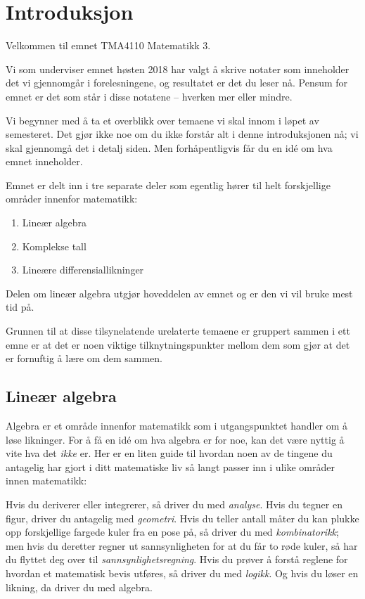 

\chapter*{Introduksjon}
\label{ch:introduksjon}

Velkommen til emnet TMA4110 Matematikk 3.

Vi som underviser emnet høsten 2018 har valgt å skrive notater som
inneholder det vi gjennomgår i forelesningene, og resultatet er det du
leser nå.  Pensum for emnet er det som står i disse notatene --
hverken mer eller mindre.

Vi begynner med å ta et overblikk over temaene vi skal innom i løpet
av semesteret.  Det gjør ikke noe om du ikke forstår alt i denne
introduksjonen nå; vi skal gjennomgå det i detalj siden.  Men
forhåpentligvis får du en idé om hva emnet inneholder.

\smallskip

Emnet er delt inn i tre separate deler som egentlig hører til helt
forskjellige områder innenfor matematikk:
\begin{enumerate}
\item Lineær algebra
\item Komplekse tall
\item Lineære differensiallikninger
\end{enumerate}
Delen om lineær algebra utgjør hoveddelen av emnet og er den vi vil
bruke mest tid på.

\smallskip

Grunnen til at disse tilsynelatende urelaterte temaene er gruppert
sammen i ett emne er at det er noen viktige tilknytningspunkter mellom
dem som gjør at det er fornuftig å lære om dem sammen.


\section*{Lineær algebra}

Algebra er et område innenfor matematikk som i utgangspunktet handler
om å løse likninger.  For å få en idé om hva algebra er for noe, kan
det være nyttig å vite hva det \emph{ikke} er.  Her er en liten guide
til hvordan noen av de tingene du antagelig har gjort i ditt
matematiske liv så langt passer inn i ulike områder innen matematikk:

Hvis du deriverer eller integrerer, så driver du med \emph{analyse}.
Hvis du tegner en figur, driver du antagelig med \emph{geometri}.
Hvis du teller antall måter du kan plukke opp forskjellige fargede
kuler fra en pose på, så driver du med \emph{kombinatorikk}; men hvis
du deretter regner ut sannsynligheten for at du får to røde kuler, så
har du flyttet deg over til \emph{sannsynlighetsregning}.  Hvis du
prøver å forstå reglene for hvordan et matematisk bevis utføres, så
driver du med \emph{logikk}.  Og hvis du løser en likning, da driver
du med algebra.

